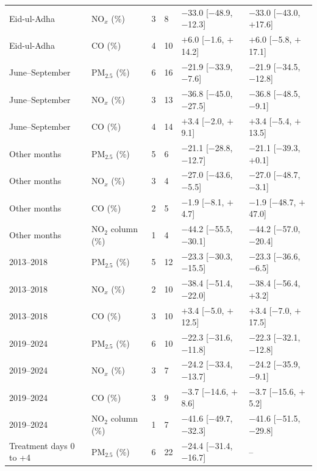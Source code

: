 \begin{longtable}{L{4.6cm} L{2.6cm} C{0.5cm} C{0.8cm} C{3.2cm} C{3.2cm}}
Eid-ul-Adha & NO$_x$ (\%) & 3 & 8 & $-$33.0 {\scriptsize[$-$48.9, $-$12.3]} & $-$33.0 {\scriptsize[$-$43.0, $+$17.6]} \\
Eid-ul-Adha & CO (\%) & 4 & 10 & $+$6.0 {\scriptsize[$-$1.6, $+$14.2]} & $+$6.0 {\scriptsize[$-$5.8, $+$17.1]} \\
June--September & PM$_{2.5}$ (\%) & 6 & 16 & $-$21.9 {\scriptsize[$-$33.9, $-$7.6]} & $-$21.9 {\scriptsize[$-$34.5, $-$12.8]} \\
June--September & NO$_x$ (\%) & 3 & 13 & $-$36.8 {\scriptsize[$-$45.0, $-$27.5]} & $-$36.8 {\scriptsize[$-$48.5, $-$9.1]} \\
June--September & CO (\%) & 4 & 14 & $+$3.4 {\scriptsize[$-$2.0, $+$9.1]} & $+$3.4 {\scriptsize[$-$5.4, $+$13.5]} \\
Other months & PM$_{2.5}$ (\%) & 5 & 6 & $-$21.1 {\scriptsize[$-$28.8, $-$12.7]} & $-$21.1 {\scriptsize[$-$39.3, $+$0.1]} \\
Other months & NO$_x$ (\%) & 3 & 4 & $-$27.0 {\scriptsize[$-$43.6, $-$5.5]} & $-$27.0 {\scriptsize[$-$48.7, $-$3.1]} \\
Other months & CO (\%) & 2 & 5 & $-$1.9 {\scriptsize[$-$8.1, $+$4.7]} & $-$1.9 {\scriptsize[$-$48.7, $+$47.0]} \\
Other months & NO$_2$ column (\%) & 1 & 4 & $-$44.2 {\scriptsize[$-$55.5, $-$30.1]} & $-$44.2 {\scriptsize[$-$57.0, $-$20.4]} \\
2013--2018 & PM$_{2.5}$ (\%) & 5 & 12 & $-$23.3 {\scriptsize[$-$30.3, $-$15.5]} & $-$23.3 {\scriptsize[$-$36.6, $-$6.5]} \\
2013--2018 & NO$_x$ (\%) & 2 & 10 & $-$38.4 {\scriptsize[$-$51.4, $-$22.0]} & $-$38.4 {\scriptsize[$-$56.4, $+$3.2]} \\
2013--2018 & CO (\%) & 3 & 10 & $+$3.4 {\scriptsize[$-$5.0, $+$12.5]} & $+$3.4 {\scriptsize[$-$7.0, $+$17.5]} \\
2019--2024 & PM$_{2.5}$ (\%) & 6 & 10 & $-$22.3 {\scriptsize[$-$31.6, $-$11.8]} & $-$22.3 {\scriptsize[$-$32.1, $-$12.8]} \\
2019--2024 & NO$_x$ (\%) & 3 & 7 & $-$24.2 {\scriptsize[$-$33.4, $-$13.7]} & $-$24.2 {\scriptsize[$-$35.9, $-$9.1]} \\
2019--2024 & CO (\%) & 3 & 9 & $-$3.7 {\scriptsize[$-$14.6, $+$8.6]} & $-$3.7 {\scriptsize[$-$15.6, $+$5.2]} \\
2019--2024 & NO$_2$ column (\%) & 1 & 7 & $-$41.6 {\scriptsize[$-$49.7, $-$32.3]} & $-$41.6 {\scriptsize[$-$51.5, $-$29.8]} \\
Treatment days 0 to +4 & PM$_{2.5}$ (\%) & 6 & 22 & $-$24.4 {\scriptsize[$-$31.4, $-$16.7]} & -- \\

\end{longtable}
